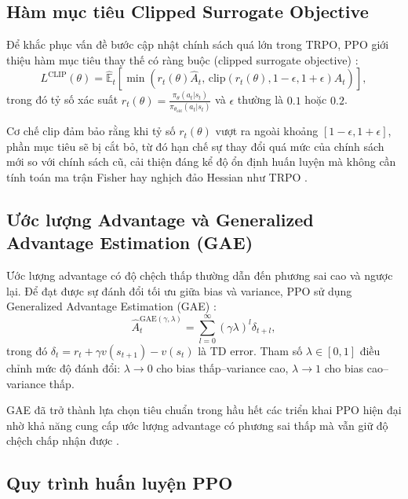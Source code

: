 \documentclass{uetgraduation}
\begin{document}
\subsection{Hàm mục tiêu Clipped Surrogate Objective}

Để khắc phục vấn đề bước cập nhật chính sách quá lớn trong TRPO, PPO giới thiệu hàm mục tiêu thay thế có ràng buộc (clipped surrogate objective) \cite{schulman2017}:
\[
L^{\text{CLIP}}(\theta) = \hat{\mathbb{E}}_{t} \left[ \min \left( r_t(\theta) \hat{A}_t, \, \text{clip}(r_t(\theta), 1-\epsilon, 1+\epsilon) \hat{A}_t \right) \right],
\]
trong đó tỷ số xác suất $r_t(\theta) = \frac{\pi_\theta(a_t|s_t)}{\pi_{\theta_{\text{old}}}(a_t|s_t)}$ và $\epsilon$ thường là $0.1$ hoặc $0.2$.

Cơ chế clip đảm bảo rằng khi tỷ số $r_t(\theta)$ vượt ra ngoài khoảng $[1-\epsilon, 1+\epsilon]$, phần mục tiêu sẽ bị cắt bỏ, từ đó hạn chế sự thay đổi quá mức của chính sách mới so với chính sách cũ, cải thiện đáng kể độ ổn định huấn luyện mà không cần tính toán ma trận Fisher hay nghịch đảo Hessian như TRPO \cite{schulman2017}.

\subsection{Ước lượng Advantage và Generalized Advantage Estimation (GAE)}

Ước lượng advantage có độ chệch thấp thường dẫn đến phương sai cao và ngược lại. Để đạt được sự đánh đổi tối ưu giữa bias và variance, PPO sử dụng Generalized Advantage Estimation (GAE) \cite{schulman2017}:
\[
\hat{A}_t^{\text{GAE}(\gamma,\lambda)} = \sum_{l=0}^{\infty} (\gamma \lambda)^l \delta_{t+l},
\]
trong đó $\delta_t = r_t + \gamma v(s_{t+1}) - v(s_t)$ là TD error. Tham số $\lambda \in [0,1]$ điều chỉnh mức độ đánh đổi: $\lambda \to 0$ cho bias thấp–variance cao, $\lambda \to 1$ cho bias cao–variance thấp.

GAE đã trở thành lựa chọn tiêu chuẩn trong hầu hết các triển khai PPO hiện đại nhờ khả năng cung cấp ước lượng advantage có phương sai thấp mà vẫn giữ độ chệch chấp nhận được \cite{schulman2017}.

\subsection{Quy trình huấn luyện PPO}
\end{document}
